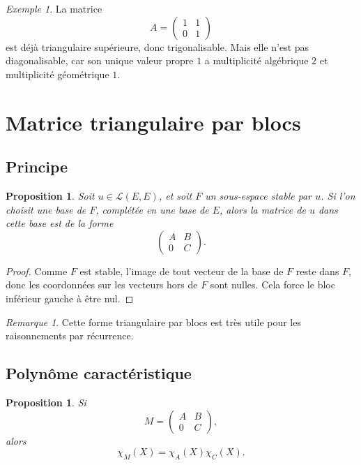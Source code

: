 \documentclass[11pt,a4paper]{article}
\newtheorem{proposition}[definition]{Proposition}
\theoremstyle{remark}
\newtheorem{remarque}[definition]{Remarque}
\newtheorem{exemple}[definition]{Exemple}
\begin{document}
\begin{exemple}
La matrice
\[
A=
\begin{pmatrix}
1 & 1\\
0 & 1
\end{pmatrix}
\]
est déjà triangulaire supérieure, donc trigonalisable.  
Mais elle n’est pas diagonalisable, car son unique valeur propre \(1\) a multiplicité algébrique \(2\) et multiplicité géométrique \(1\).
\end{exemple}

\section{Matrice triangulaire par blocs}

\subsection{Principe}

\begin{proposition}
Soit \(u\in\mathcal L(E,E)\), et soit \(F\) un sous-espace stable par \(u\).  
Si l’on choisit une base de \(F\), complétée en une base de \(E\), alors la matrice de \(u\) dans cette base est de la forme
\[
\begin{pmatrix}
A & B\\
0 & C
\end{pmatrix}.
\]
\end{proposition}

\begin{proof}
Comme \(F\) est stable, l’image de tout vecteur de la base de \(F\) reste dans \(F\), donc les coordonnées sur les vecteurs hors de \(F\) sont nulles. Cela force le bloc inférieur gauche à être nul.
\end{proof}

\begin{remarque}
Cette forme triangulaire par blocs est très utile pour les raisonnements par récurrence.
\end{remarque}

\subsection{Polynôme caractéristique}

\begin{proposition}
Si
\[
M=
\begin{pmatrix}
A & B\\
0 & C
\end{pmatrix},
\]
alors
\[
\chi_M(X)=\chi_A(X)\chi_C(X).
\]
\end{proposition}
\end{document}
